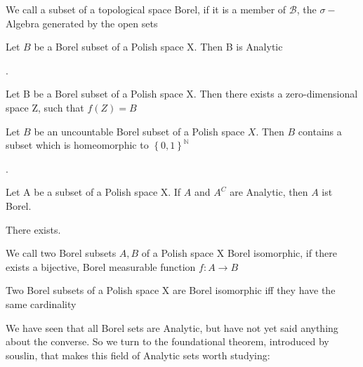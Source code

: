 \documentclass[10pt, a4paper, titlepage]{article}
\numberwithin{equation}{section}
\begin{document}
\begin{definition}
	We call a subset of a topological space Borel, if it is a member of $\mathcal{B}$, the $\sigma-$Algebra generated by the open sets
\end{definition}


\begin{theorem}
	Let $B$ be a Borel subset of a Polish space X. Then B is Analytic		
\end{theorem}


\begin{definition}
	.	
\end{definition}

\begin{theorem}
	Let B be a Borel subset of a Polish space X. Then there exists a zero-dimensional space Z, such that $f(Z) = B$
\end{theorem}

\begin{theorem}
	Let $B$ be an uncountable Borel subset of a Polish space  $X$. Then  $B$ contains a subset which is homeomorphic to  $\left\{ 0,1 \right\}^\mathbb{N}$
	
\end{theorem}


\begin{theorem}
	.
\end{theorem}


\begin{theorem}
	Let A be a subset of a Polish space X. If $A$ and  $A^{C}$ are Analytic, then $A$ ist Borel.  
\end{theorem}


\begin{theorem}
	There exists.
\end{theorem}

\begin{definition}
	We call two Borel subsets $A,B$ of a Polish space X Borel isomorphic, if there exists a bijective, Borel measurable function $f: A \to B$
\end{definition}


\begin{theorem}
	Two Borel subsets of a Polish space X are Borel isomorphic iff they have the same cardinality
\end{theorem}

We have seen that all Borel sets are Analytic, but have not yet said anything about the converse. So we turn to the foundational theorem, introduced by souslin, that makes this field of Analytic sets worth studying:
\begin{definition}
	
\end{definition}
\end{document}
